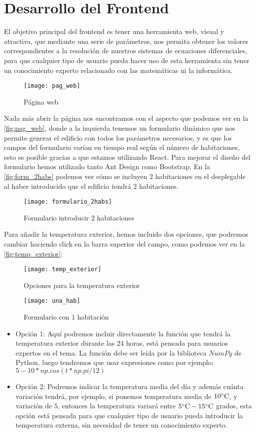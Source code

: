 \section{Desarrollo del Frontend}
El objetivo principal del frontend es tener una herramienta web, visual y atractiva, que mediante una serie de parámetros, nos permita obtener los valores correspondientes a la resolución de nuestros sistemas de ecuaciones diferenciales, para que cualquier tipo de usuario pueda hacer uso de esta herramienta sin tener un conocimiento experto relacionado con las matemáticas ni la informática.
\begin{figure}[h!]
	\centering
	\texttt{[image: pag\_web]}
	\caption{Página web}
	\label{fig:pag_web}
\end{figure}

Nada más abrir la página nos encontramos con el aspecto que podemos ver en la \autoref{fig:pag_web}, donde a la izquierda tenemos un formulario dinámico que nos permite generar el edificio con todos los parámetros necesarios, y es que los campos del formulario varían en tiempo real según el número de habitaciones, esto es posible gracias a que estamos utilizando React. Para mejorar el diseño del formulario hemos utilizado tanto Ant Design como Bootstrap.
En la \autoref{fig:form_2habs} podemos ver cómo se incluyen 2 habitaciones en el desplegable al haber introducido que el edificio tendrá 2 habitaciones.
\begin{figure}[h!]
	\centering
	\texttt{[image: formulario\_2habs]}
	\caption{Formulario introducir $2$ habitaciones}
	\label{fig:form_2habs}
\end{figure}
Para añadir la temperatura exterior, hemos incluido dos opciones, que podremos cambiar haciendo click en la barra superior del campo, como podemos ver en la \autoref{fig:temp_exterior}:
\begin{figure}[h!]
	\centering
	\texttt{[image: temp\_exterior]}
	\caption{Opciones para la temperatura exterior}
	\label{fig:temp_exterior}
\end{figure}
\begin{figure}[h!]
	\centering
	\texttt{[image: una\_hab]}
	\caption{Formulario con $1$ habitación}
	\label{fig:una_hab}
\end{figure}
\begin{itemize}
	\item Opción $1$: Aquí podremos incluir directamente la función que tendrá la temperatura exterior durante las $24$ horas, está pensada para usuarios expertos en el tema. La función debe ser leída por la biblioteca $NumPy$ de Python, luego tendremos que usar expresiones como por ejemplo: $5 - 10*np.cos(t*np.pi/12)$
	\item Opción $2$: Podremos indicar la temperatura media del día y además cuánta variación tendrá, por ejemplo, si ponemos temperatura media de $10 \celsius$, y variación de $5$, entonces la temperatura variará entre $5 \celsius -15 \celsius$ grados, esta opción está pensada para que cualquier tipo de usuario pueda introducir la temperatura externa, sin necesidad de tener un conocimiento experto.
\end{itemize}

